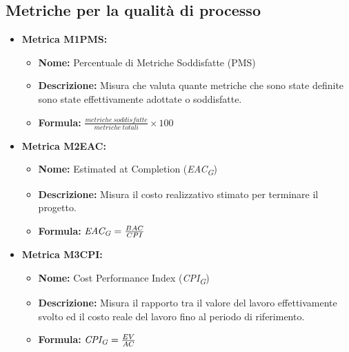 \subsection{Metriche per la qualità di processo}
\begin{itemize}
    \item \hypertarget{item:M1PMS}{\textbf{Metrica M1PMS:}}
    \begin{minipage}[t]{0.9\textwidth}
           \begin{itemize}
            \item \textbf{Nome:} Percentuale di Metriche Soddisfatte (PMS)
            \item \textbf{Descrizione:} Misura che valuta quante metriche che sono state definite sono state effettivamente adottate o soddisfatte.
            \item \textbf{Formula:} $\frac{metriche \ soddisfatte}{metriche \ totali}\times 100$
           \end{itemize}
        \end{minipage}

    \item \hypertarget{item:M2EAC}{\textbf{Metrica M2EAC:}}
     \begin{minipage}[t]{0.9\textwidth}
          \begin{itemize}
              \item \textbf{Nome:} Estimated at Completion (\textit{EAC}\textsubscript{\textit{G}})
              \item \textbf{Descrizione:} Misura il costo realizzativo stimato per terminare il progetto.
              \item \textbf{Formula:} $\textit{EAC}\textsubscript{\textit{G}} = \frac{BAC}{CPI}$
          \end{itemize}
        \end{minipage}

    \item \hypertarget{item:M3CPI}{\textbf{Metrica M3CPI:}}
    \begin{minipage}[t]{0.9\textwidth}
          \begin{itemize}
              \item \textbf{Nome:} Cost Performance Index (\textit{CPI}\textsubscript{\textit{G}})
              \item \textbf{Descrizione:} Misura il rapporto tra il valore del lavoro effettivamente svolto ed il costo reale del lavoro fino al periodo di riferimento.
              \item \textbf{Formula:} $\textit{CPI}\textsubscript{\textit{G}} = \frac{EV}{AC}$
          \end{itemize}
        \end{minipage}


\end{itemize}
